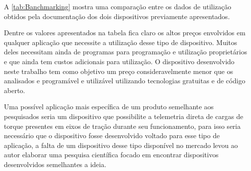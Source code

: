 A \autoref{tab:Banchmarking} mostra uma comparação entre os dados de utilização obtidos pela documentação dos dois dispositivos previamente apresentados.

\begin{table}[!ht]
    \caption{Comparação entre dispositivos encontrados}
    \label{tab:Banchmarking}
    \centering
\end{table}

Dentre os valores apresentados na tabela fica claro os altos preços envolvidos em qualquer aplicação que necessite a utilização desse tipo de dispositivo.
Muitos deles necessitam ainda de programas para programação e utilização proprietários e que ainda tem custos adicionais para utilização.
O dispositivo desenvolvido neste trabalho tem como objetivo um preço consideravelmente menor que os analisados e programável e utilizável utilizando tecnologias gratuitas
e de código aberto.

Uma possível aplicação mais específica de um produto semelhante aos pesquisados seria um dispositivo que possibilite a telemetria direta de cargas de torque presentes em
eixos de tração durante seu funcionamento, para isso seria necessário que o dispositivo fosse desenvolvido voltado para esse tipo de aplicação, a falta de um dispositivo
desse tipo disponível no mercado levou ao autor elaborar uma pesquisa científica focado em encontrar dispositivos desenvolvidos semelhantes a ideia.


